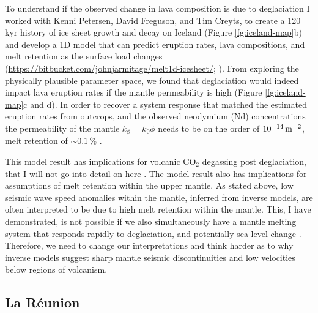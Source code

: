 To understand if the observed change in lava composition is due to deglaciation I worked with Kenni Petersen, David Freguson, and Tim Creyts, to create a 120\,kyr history of ice sheet growth and decay on Iceland (Figure \ref{fg:iceland-map}b) and develop a 1D model that can predict eruption rates, lava compositions, and melt retention as the surface load changes (\url{https://bitbucket.com/johnjarmitage/melt1d-icesheet/}; \citealp{armitage-etal-grl-2019}). From exploring the physically plausible parameter space, we found that deglaciation would indeed impact lava eruption rates if the mantle permeability is high (Figure \ref{fg:iceland-map}c and d). In order to recover a system response that matched the estimated eruption rates from outcrops, and the observed neodymium (Nd) concentrations the permeability of the mantle $k_{\phi} = k_{0}\phi$ needs to be on the order of $10^{-14}\rm\,m^{-2}$, melt retention of $\sim 0.1$\,\% \citep{armitage-etal-grl-2019}.

This model result has implications for volcanic CO$_{2}$ degassing post deglaciation, that I will not go into detail on here \citep[see][]{armitage-etal-grl-2019}. The model result also has implications for assumptions of melt retention within the upper mantle. As stated above, low seismic wave speed anomalies within the mantle, inferred from inverse models, are often interpreted to be due to high melt retention within the mantle. This, I have demonstrated, is not possible if we also simultaneously have a mantle melting system that responds rapidly to deglaciation, and potentially sea level change \citep{huybers-2009}. Therefore, we need to change our interpretations and think harder as to why inverse models suggest sharp mantle seismic discontinuities and low velocities below regions of volcanism.

\subsection{La Réunion}

